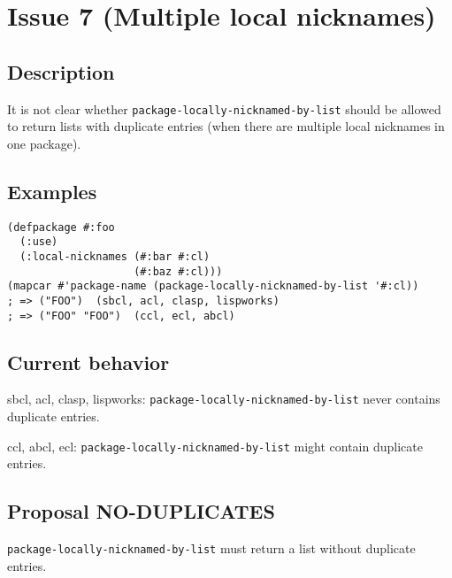 \documentclass[11pt]{article}
\author{Grolter Bell}
\date{\today}
\title{}
\begin{document}
\section{Issue 7 (Multiple local nicknames)}
\label{sec:org7f543ee}
\subsection{Description}
\label{sec:org90d01d6}
It is not clear whether \texttt{package-locally-nicknamed-by-list} should be allowed to return
lists with duplicate entries (when there are multiple local nicknames in one package).
\subsection{Examples}
\label{sec:org411a585}
\begin{verbatim}
(defpackage #:foo
  (:use)
  (:local-nicknames (#:bar #:cl)
                    (#:baz #:cl)))
(mapcar #'package-name (package-locally-nicknamed-by-list '#:cl))
; => ("FOO")  (sbcl, acl, clasp, lispworks)
; => ("FOO" "FOO")  (ccl, ecl, abcl)
\end{verbatim}
\subsection{Current behavior}
\label{sec:org5ac190a}
sbcl, acl, clasp, lispworks:
  \texttt{package-locally-nicknamed-by-list} never contains duplicate entries.

ccl, abcl, ecl:
  \texttt{package-locally-nicknamed-by-list} might contain duplicate entries.
\subsection{Proposal NO-DUPLICATES}
\label{sec:org360aa94}
\texttt{package-locally-nicknamed-by-list} must return a list without duplicate entries.
\end{document}
